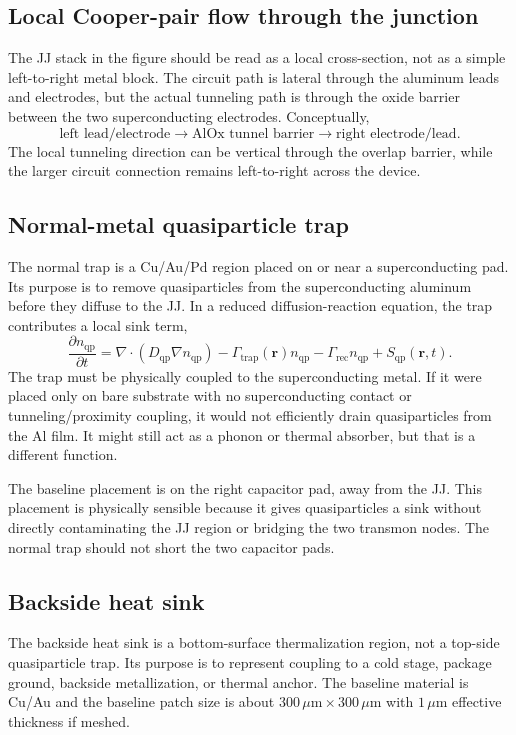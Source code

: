 \documentclass[11pt]{article}
\begin{document}
\subsection{Local Cooper-pair flow through the junction}
The JJ stack in the figure should be read as a local cross-section, not as a simple left-to-right metal block. The circuit path is lateral through the aluminum leads and electrodes, but the actual tunneling path is through the oxide barrier between the two superconducting electrodes. Conceptually,
\begin{equation}
    \text{left lead/electrode} \rightarrow \text{AlOx tunnel barrier} \rightarrow \text{right electrode/lead}.
\end{equation}
The local tunneling direction can be vertical through the overlap barrier, while the larger circuit connection remains left-to-right across the device.

\subsection{Normal-metal quasiparticle trap}
The normal trap is a Cu/Au/Pd region placed on or near a superconducting pad. Its purpose is to remove quasiparticles from the superconducting aluminum before they diffuse to the JJ. In a reduced diffusion-reaction equation, the trap contributes a local sink term,
\begin{equation}
    \frac{\partial n_{\mathrm{qp}}}{\partial t}
    = \nabla\cdot(D_{\mathrm{qp}}\nabla n_{\mathrm{qp}})
    - \Gamma_{\mathrm{trap}}(\mathbf{r}) n_{\mathrm{qp}}
    - \Gamma_{\mathrm{rec}} n_{\mathrm{qp}}
    + S_{\mathrm{qp}}(\mathbf{r},t).
    \label{eq:qp_trap_model}
\end{equation}
The trap must be physically coupled to the superconducting metal. If it were placed only on bare substrate with no superconducting contact or tunneling/proximity coupling, it would not efficiently drain quasiparticles from the Al film. It might still act as a phonon or thermal absorber, but that is a different function.

The baseline placement is on the right capacitor pad, away from the JJ. This placement is physically sensible because it gives quasiparticles a sink without directly contaminating the JJ region or bridging the two transmon nodes. The normal trap should not short the two capacitor pads.

\subsection{Backside heat sink}
The backside heat sink is a bottom-surface thermalization region, not a top-side quasiparticle trap. Its purpose is to represent coupling to a cold stage, package ground, backside metallization, or thermal anchor. The baseline material is Cu/Au and the baseline patch size is about $300\,\mu\mathrm{m}\times300\,\mu\mathrm{m}$ with $1\,\mu\mathrm{m}$ effective thickness if meshed.
\end{document}
